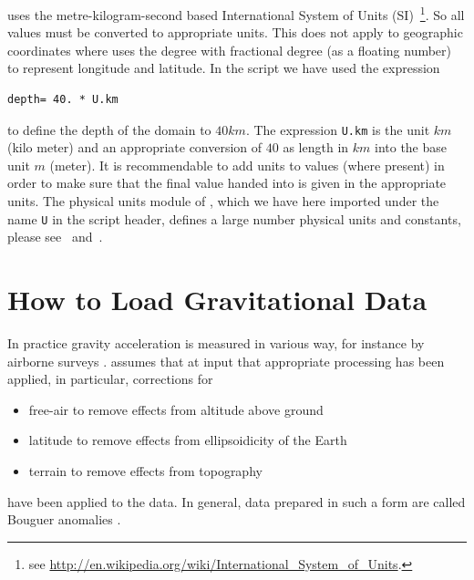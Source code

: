 \downunder uses the  metre-kilogram-second based 
International System of Units (SI)~\footnote{see \url{http://en.wikipedia.org/wiki/International_System_of_Units}.}. So all 
values must be converted to appropriate units. This does not apply to geographic coordinates where \downunder uses
the degree with fractional degree (as a floating number) to represent longitude and latitude. In the script we have used the expression
\begin{verbatim}
depth= 40. * U.km
\end{verbatim}
to define the depth of the domain to $40 km$. The expression \verb|U.km| is the unit $km$ (kilo meter) and an appropriate conversion 
of $40$ as length in $km$  into the base unit $m$ (meter). It is recommendable to add units to values (where present) 
in order to make sure that the final value handed into \downunder is given in the appropriate units. The physical units
module of \escript, which we have here imported under the name \verb|U| in the script header, defines a large number 
physical units and constants, please see~\cite{ESCRIPT} and~\cite{ESCRIPTONLINE}. 

\section{How to Load Gravitational Data}\label{SEC:P1:GRAV:DATA}
In practice gravity acceleration is measured in various way, for instance by airborne surveys . \downunder
assumes that at input that appropriate processing has been applied,  
in particular, corrections for  
\begin{itemize}
 \item free-air to remove effects from altitude above ground 
 \item latitude to remove effects from ellipsoidicity of the Earth  
 \item terrain to remove effects from topography  
\end{itemize}
have been applied to the data. In general, data prepared in such a form are called Bouguer anomalies . 

